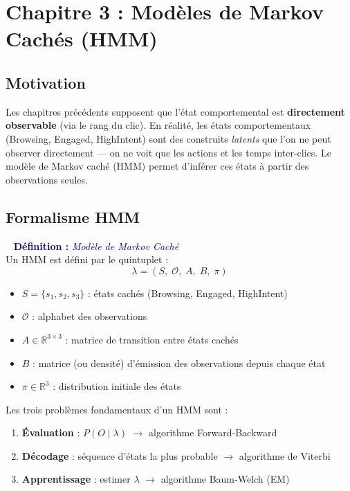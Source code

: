 \documentclass[11pt,a4paper]{article}
\newenvironment{defbox}[1]{%
  \vspace{3pt}\begin{framed}
  \noindent{\color{NavyBlue}\rule{0.3cm}{3pt}}~%
  \textcolor{DarkBlue}{\textbf{Définition :} \textit{#1}}\\[3pt]}
  {\end{framed}\vspace{3pt}}
\begin{document}
\medskip

\newpage
\section{Chapitre 3 : Modèles de Markov Cachés (HMM)}

\subsection{Motivation}

Les chapitres précédents supposent que l'état comportemental est \textbf{directement observable}
(via le rang du clic). En réalité, les états comportementaux (Browsing, Engaged, HighIntent)
sont des construits \textit{latents} que l'on ne peut observer directement --- on ne voit que
les actions et les temps inter-clics. Le modèle de Markov caché (HMM) permet d'inférer ces
états à partir des observations seules.

\subsection{Formalisme HMM}

\begin{defbox}{Modèle de Markov Caché}
Un HMM est défini par le quintuplet :
\[
\lambda = (S,\; \mathcal{O},\; A,\; B,\; \pi)
\]
\begin{itemize}[leftmargin=1.5cm,itemsep=2pt]
  \item $S = \{s_1, s_2, s_3\}$ : états cachés (Browsing, Engaged, HighIntent)
  \item $\mathcal{O}$ : alphabet des observations
  \item $A \in \mathbb{R}^{3 \times 3}$ : matrice de transition entre états cachés
  \item $B$ : matrice (ou densité) d'émission des observations depuis chaque état
  \item $\pi \in \mathbb{R}^3$ : distribution initiale des états
\end{itemize}
\end{defbox}

Les trois problèmes fondamentaux d'un HMM sont :
\begin{enumerate}[leftmargin=2cm,itemsep=2pt]
  \item \textbf{Évaluation} : $P(O \mid \lambda)$ $\to$ algorithme Forward-Backward
  \item \textbf{Décodage} : séquence d'états la plus probable $\to$ algorithme de Viterbi
  \item \textbf{Apprentissage} : estimer $\lambda$ $\to$ algorithme Baum-Welch (EM)
\end{enumerate}
\end{document}
